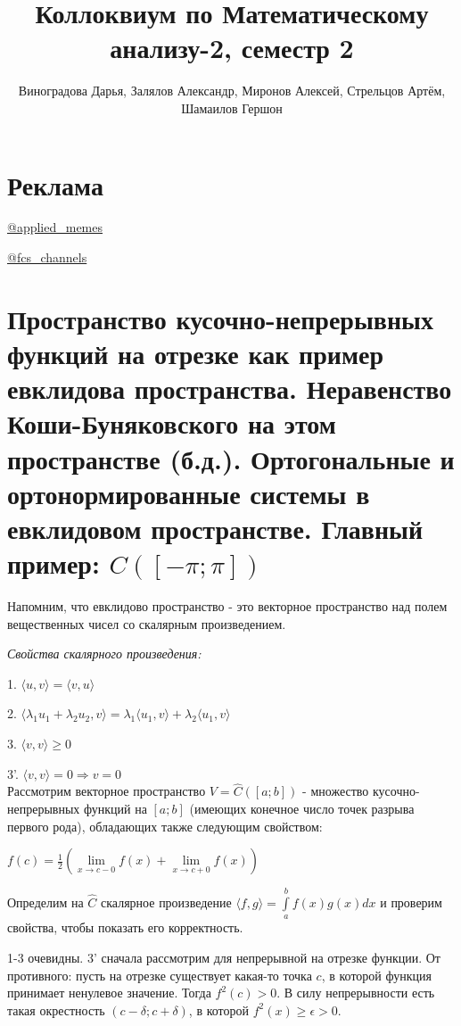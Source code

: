 \documentclass{article}
\title{Коллоквиум по Математическому анализу-2, семестр 2}
\author{Виноградова Дарья, Залялов Александр, Миронов Алексей, Стрельцов Артём, Шамаилов Гершон}
\date{}
\begin{document}
	\maketitle

	\tableofcontents

    \clearpage
    
    \section*{Реклама}
    \href{https://t.me/applied_memes}{@applied\_memes}\par
    \href{https://t.me/fcs_channels}{@fcs\_channels}

	\setcounter{section}{0}
	
	\section{Пространство кусочно-непрерывных функций на отрезке как пример евклидова пространства. Неравенство Коши-Буняковского на этом пространстве (б.д.). Ортогональные и ортонормированные системы в евклидовом пространстве. Главный пример: $C([-\pi; \pi])$}
	
	Напомним, что евклидово пространство - это векторное пространство над полем вещественных чисел со скалярным произведением.
	
	\textit{Свойства скалярного произведения:}
	
	1. $\langle u, v \rangle=\langle v, u\rangle$
	
	2. $\langle \lambda_1 u_1 + \lambda_2 u_2, v\rangle=\lambda_1 \langle u_1, v\rangle+\lambda_2 \langle u_1, v \rangle$
	
	3. $\langle v,v \rangle \ge 0$
	
	3'. $\langle v,v \rangle = 0 \Rightarrow v=0$\\
	
	Рассмотрим векторное пространство $V=\hat C([a; b])$ - множество кусочно-непрерывных функций на $[a; b]$ (имеющих конечное число точек разрыва первого рода), обладающих также следующим свойством:
	
	$f(c)=\frac{1}{2}(\lim\limits_{x \rightarrow c-0} f(x) + \lim\limits_{x \rightarrow c+0} f(x))$
	
	 Определим на $\hat C$ скалярное произведение $\langle f, g \rangle =\int\limits_a^b f(x)g(x)dx$ и проверим свойства, чтобы показать его корректность.
	
	1-3 очевидны. 3' сначала рассмотрим для непрерывной на отрезке функции. 
	От противного: пусть на отрезке существует какая-то точка $c$, в которой функция принимает ненулевое значение. Тогда $f^2(c) > 0$. В силу непрерывности есть такая окрестность $(c-\delta; c+\delta)$, в которой $f^2(x) \ge \epsilon > 0$.
	
\end{document}
